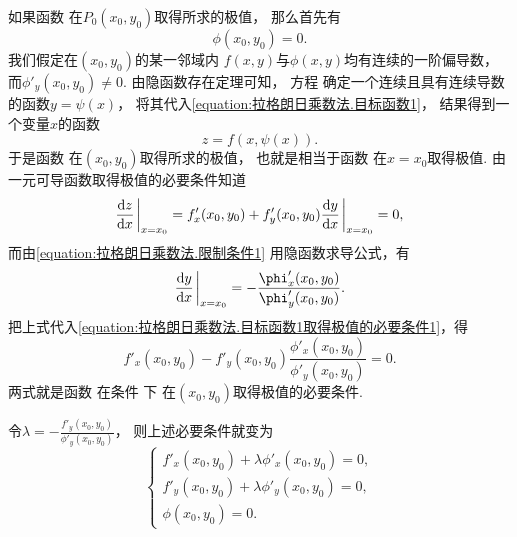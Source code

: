 如果函数 
在\(P_0(x_0,y_0)\)取得所求的极值，
那么首先有
\begin{equation}\label{equation:拉格朗日乘数法.限制条件1在P0}
	\phi(x_0,y_0)=0.
\end{equation}
我们假定在\((x_0,y_0)\)的某一邻域内
\(f(x,y)\)与\(\phi(x,y)\)均有连续的一阶偏导数，
而\(\phi'_y(x_0,y_0)\neq0\).
由隐函数存在定理可知，
方程 
确定一个连续且具有连续导数的函数\(y=\psi(x)\)，
将其代入\cref{equation:拉格朗日乘数法.目标函数1}，
结果得到一个变量\(x\)的函数
\begin{equation}\label{equation:拉格朗日乘数法.目标函数1.代入限制条件1}
	z=f(x,\psi(x)).
\end{equation}
于是函数  在\((x_0,y_0)\)取得所求的极值，
也就是相当于函数  在\(x=x_0\)取得极值.
由一元可导函数取得极值的必要条件知道
\begin{equation}\label{equation:拉格朗日乘数法.目标函数1取得极值的必要条件1}
	\dv{z}{x}\eval_{x=x_0}
	= f'_x(x_0,y_0) + f'_y(x_0,y_0) \dv{y}{x}\eval_{x=x_0}
	= 0,
\end{equation}
而由\cref{equation:拉格朗日乘数法.限制条件1} 用隐函数求导公式，有\[
	\dv{y}{x}\eval_{x=x_0}
	= -\frac{\phi'_x(x_0,y_0)}{\phi'_y(x_0,y_0)}.
\]
把上式代入\cref{equation:拉格朗日乘数法.目标函数1取得极值的必要条件1}，得
\begin{equation}\label{equation:拉格朗日乘数法.目标函数1取得极值的必要条件2}
	f'_x(x_0,y_0) - f'_y(x_0,y_0) \frac{\phi'_x(x_0,y_0)}{\phi'_y(x_0,y_0)}
	= 0.
\end{equation}
两式就是函数 
在条件  下
在\((x_0,y_0)\)取得极值的必要条件.

令\(\lambda=-\frac{f'_y(x_0,y_0)}{\phi'_y(x_0,y_0)}\)，
则上述必要条件就变为
\begin{equation}\label{equation:拉格朗日乘数法.目标函数1取得极值的必要条件3}
	\left\{ \begin{array}{l}
		f'_x(x_0,y_0) + \lambda \phi'_x(x_0,y_0) = 0, \\
		f'_y(x_0,y_0) + \lambda \phi'_y(x_0,y_0) = 0, \\
		\phi(x_0,y_0) = 0.
	\end{array} \right.
\end{equation}

